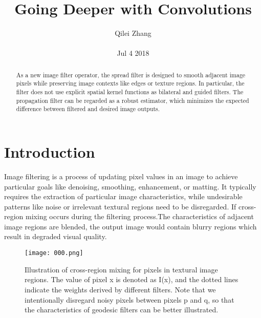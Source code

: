 \documentclass[30pt,twocolumn,letterpaper]{article}
\author{Qilei Zhang\\\\
Jul 4 2018}
\title{Going Deeper with Convolutions}
\begin{document}
\maketitle
\begin{abstract}
  As a new image filter operator, the spread filter is designed to smooth adjacent image pixels while preserving image contexts like edges or texture regions. In particular, the filter does not use explicit spatial kernel functions as bilateral and guided filters. The propagation filter can be regarded as a robust estimator, which minimizes the expected difference between filtered and desired image outputs.
\end{abstract}
\section{Introduction}
Image filtering is a process of updating pixel values in an image to achieve particular goals like denoising, smoothing, enhancement, or matting. It typically requires the extraction of particular image characteristics, while undesirable patterns like noise or irrelevant textural regions need to be disregarded. If cross-region mixing occurs during the filtering process.The characteristics of adjacent image regions are blended, the output image would contain blurry regions which result in degraded visual quality\cite{Gallin2013Going}. \\
\begin{figure}[htbp]
\small
\centering
\texttt{[image: 000.png]}
\caption{Illustration of cross-region mixing for pixels in
textural image regions. The value of pixel x is denoted as I(x),
and the dotted lines indicate the weights derived by different filters.
Note that we intentionally disregard noisy pixels between
pixels p and q, so that the characteristics of geodesic filters can be
better illustrated.
}
\label{fig:lable}
\end{figure}\\
\end{document}
